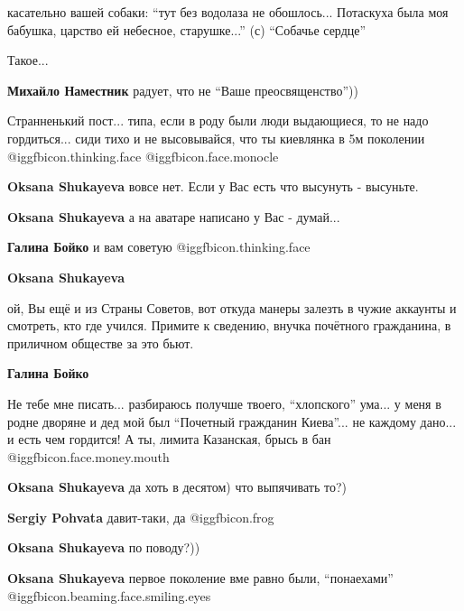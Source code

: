 \begin{itemize}
\begin{itemize}
касательно вашей собаки: \enquote{тут без водолаза не обошлось... Потаскуха была моя
бабушка, царство ей небесное, старушке...} (с) \enquote{Собачье сердце}

\end{itemize} %

Такое...

\textbf{Михайло Наместник} радует, что не \enquote{Ваше преосвященство}))


Странненький пост... типа, если в роду были люди выдающиеся, то не надо
гордиться... сиди тихо и не высовывайся, что ты киевлянка в 5м поколении
@igg{fbicon.thinking.face}  @igg{fbicon.face.monocle} 

\begin{itemize} %
\textbf{Oksana Shukayeva} вовсе нет. Если у Вас есть что высунуть - высуньте.

\textbf{Oksana Shukayeva} а на аватаре написано у Вас - думай...

\begin{itemize} %
\textbf{Галина Бойко} и вам советую @igg{fbicon.thinking.face} 

\textbf{Oksana Shukayeva} 

ой, Вы ещё и из Страны Советов, вот откуда манеры залезть в чужие аккаунты и
смотреть, кто где учился. Примите к сведению, внучка почётного гражданина, в
приличном обществе за это бьют.

\textbf{Галина Бойко} 

Не тебе мне писать... разбираюсь получше твоего, \enquote{хлопского} ума... у меня в
родне дворяне и дед мой был \enquote{Почетный гражданин Киева}... не каждому дано... и
есть чем гордится! А ты, лимита Казанская, брысь в бан @igg{fbicon.face.money.mouth} 

\end{itemize} %

\textbf{Oksana Shukayeva} да хоть в десятом) что выпячивать то?)

\textbf{Sergiy Pohvata} давит-таки, да @igg{fbicon.frog} 

\textbf{Oksana Shukayeva} по поводу?))

\textbf{Oksana Shukayeva} первое поколение вме равно были, \enquote{понаехами} @igg{fbicon.beaming.face.smiling.eyes} 


\end{itemize}
\end{itemize}
